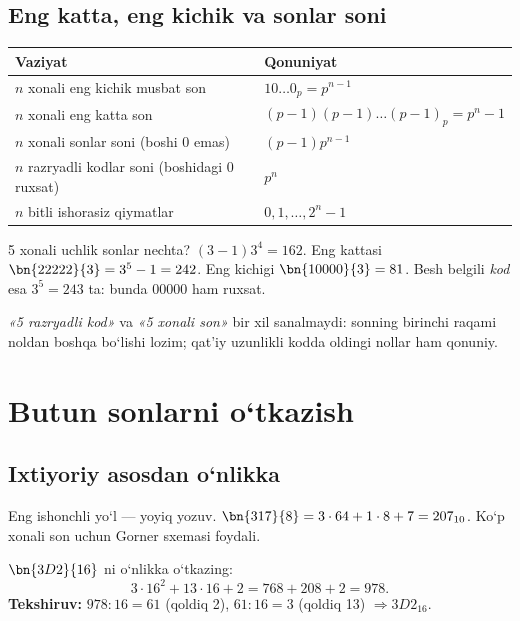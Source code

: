 \documentclass[11pt,a4paper,openany,oneside]{book}
\begin{document}
\section{Eng katta, eng kichik va sonlar soni}
\begin{center}\renewcommand{\arraystretch}{1.25}
\begin{tabularx}{\textwidth}{@{}X X@{}}\toprule
Vaziyat & Qonuniyat \\ \midrule
\(n\) xonali eng kichik musbat son & \(10\ldots0_p=p^{n-1}\) \\
\(n\) xonali eng katta son & \((p-1)(p-1)\ldots(p-1)_p=p^n-1\) \\
\(n\) xonali sonlar soni (boshi 0 emas) & \((p-1)p^{n-1}\) \\
\(n\) razryadli kodlar soni (boshidagi 0 ruxsat) & \(p^n\) \\
\(n\) bitli ishorasiz qiymatlar & \(0,1,\ldots,2^n-1\) \\
\bottomrule\end{tabularx}\end{center}
\begin{worked}
5 xonali uchlik sonlar nechta? \((3-1)3^4=162\). Eng kattasi \(\bn{22222}{3}=3^5-1=242\). Eng kichigi \(\bn{10000}{3}=81\). Besh belgili \emph{kod} esa \(3^5=243\) ta: bunda \(00000\) ham ruxsat.
\end{worked}
\begin{mistake}
\emph{«5 razryadli kod»} va \emph{«5 xonali son»} bir xil sanalmaydi: sonning birinchi raqami noldan boshqa bo‘lishi lozim; qat’iy uzunlikli kodda oldingi nollar ham qonuniy.
\end{mistake}

\chapter{Butun sonlarni o‘tkazish}
\section{Ixtiyoriy asosdan o‘nlikka}
Eng ishonchli yo‘l — yoyiq yozuv. \(\bn{317}{8}=3\cdot64+1\cdot8+7=207_{10}\). Ko‘p xonali son uchun Gorner sxemasi foydali. 
\begin{worked}
\(\bn{3D2}{16}\) ni o‘nlikka o‘tkazing:
\[3\cdot16^2+13\cdot16+2=768+208+2=978.\]
\textbf{Tekshiruv:} \(978:16=61\) (qoldiq 2), \(61:16=3\) (qoldiq 13) \(\Rightarrow 3D2_{16}\).
\end{worked}
\end{document}
